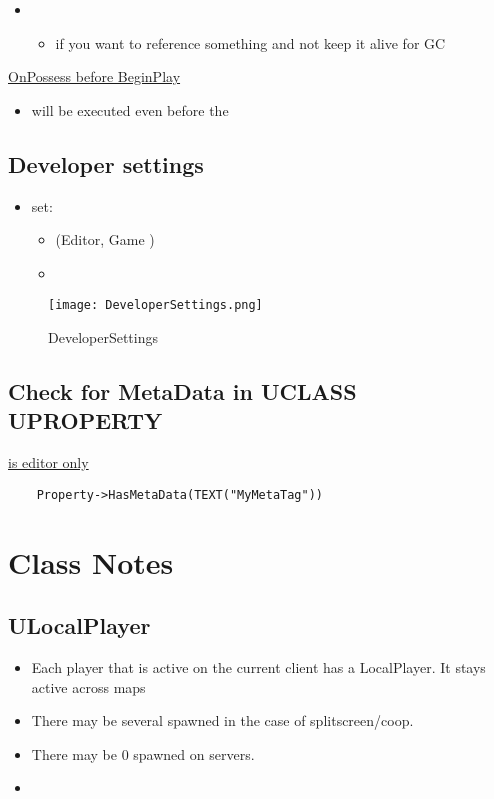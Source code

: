 \begin{itemize}
    \item {}
    \begin{itemize}
        \item if you want to reference something and not keep it alive for GC
    \end{itemize}
\end{itemize}

\uline{OnPossess before BeginPlay}
    \begin{itemize}
        \item {} will be executed even before the 
    \end{itemize}


    

    \subsection{Developer settings}
        \begin{itemize}
            \item set:
            \begin{itemize}
                \item {} (Editor, Game )
                \item {}
            \end{itemize}
        \end{itemize}

        \begin{figure}[H]
            \texttt{[image: DeveloperSettings.png]}
            \caption{DeveloperSettings}
            \label{}
        \end{figure}


    \subsection{Check for MetaData in UCLASS UPROPERTY}
        \uline{is editor only}
        \begin{lstlisting}
    Property->HasMetaData(TEXT("MyMetaTag"))
        \end{lstlisting}


    \section{Class Notes}
        \subsection{ULocalPlayer}
            \begin{itemize}
                \item  Each player that is active on the current client has a LocalPlayer. It stays active across maps
                \item  There may be several spawned in the case of splitscreen/coop.
                \item  There may be 0 spawned on servers.
                \item 
            \end{itemize}


